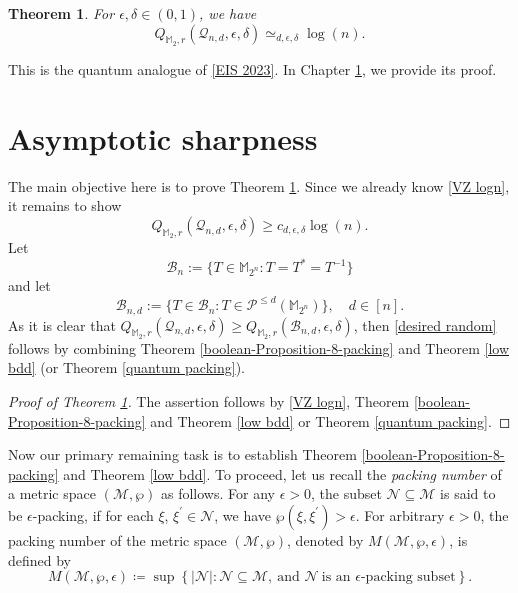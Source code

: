 \documentclass{amsbook}
\newtheorem{theorem}{Theorem}[chapter]
\theoremstyle{definition}
\theoremstyle{remark}
\numberwithin{section}{chapter}
\numberwithin{equation}{chapter}
\newcommand{\M}{\mathbb{M}}
\newcommand{\1}{\mathbf{1}}
\begin{document}
\begin{theorem}\label{thm sharpness}
For $\epsilon,\delta\in (0,1)$, we have 
$$Q_{\M_2,r}(\mathcal{Q}_{n,d},\epsilon,\delta)\simeq_{d,\epsilon,\delta}\log(n). $$
\end{theorem}

This is the quantum analogue of \eqref{EIS 2023}. In Chapter \ref{sec sharpness}, we provide its proof. 

\section{Asymptotic sharpness}\label{sec sharpness}
The main objective here is to prove Theorem \ref{thm sharpness}. 
Since we already know \eqref{VZ logn}, it remains to show 
\begin{equation}\label{desired random}
Q_{\M_2,r}(\mathcal{Q}_{n,d},\epsilon,\delta)\geq c_{d,\epsilon,\delta}\log(n).
\end{equation}
 Let
\[
\mathcal B_n:=\{T\in \mathbb M_{2^n}: T=T^*=T^{-1}\}
\]
and let
\[
\mathcal B_{n,d}:=\{T\in \mathcal B_n:T\in \mathcal{P}^{\leq d}(\M_{2^n})\},\quad d\in [n].
\]
As it is clear that $Q_{\M_2,r}(\mathcal{Q}_{n,d},\epsilon,\delta)\geq Q_{\M_2,r}(\mathcal{B}_{n,d},\epsilon,\delta)$, then \eqref{desired random} follows by  combining Theorem \ref{boolean-Proposition-8-packing} and Theorem \ref{low bdd} (or Theorem \ref{quantum packing}). 

\begin{proof}[Proof of Theorem \ref{thm sharpness}]
The assertion follows by \eqref{VZ logn}, Theorem \ref{boolean-Proposition-8-packing} and Theorem \ref{low bdd} or Theorem \ref{quantum packing}. 
\end{proof}

Now our primary remaining task is to establish Theorem \ref{boolean-Proposition-8-packing} and Theorem \ref{low bdd}. 
To proceed, let us recall the \emph{packing number} of a metric space $(\mathcal{M},\wp)$ as follows. For any $\epsilon>0$, the subset $\mathcal{N}\subseteq \mathcal{M}$ is said to be $\epsilon$-packing, if for each $\xi$, $\xi^{\prime}\in \mathcal{N}$, we have $\wp(\xi,\xi^{\prime})>\epsilon$. For arbitrary $\epsilon>0$, the packing number of the metric space $(\mathcal{M},\wp)$, denoted by $M(\mathcal{M},\wp,\epsilon)$, is defined by
\[
M(\mathcal{M},\wp,\epsilon)\coloneqq \sup\left\{|\mathcal{N}|:\mathcal{N}\subseteq \mathcal{M},~\mbox{and }\mathcal{N}~\mbox{is an }\mbox{$\epsilon$-packing subset}\right\}.
\]

 
\end{document}
